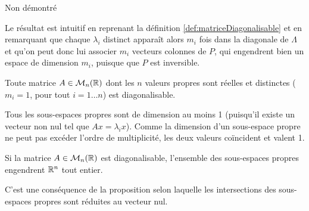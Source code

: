 \proof
Non démontré
\eproof

\remark
Le résultat est intuitif en reprenant la définition \ref{def:matriceDiagonalisable} et en remarquant que chaque $\lambda_i$ distinct apparaît alors $m_i$ fois dans la diagonale de $\Lambda$ et qu'on peut donc lui associer $m_i$ vecteurs colonnes de $P$, qui engendrent bien un espace de dimension $m_i$, puisque que $P$ est inversible.

\begin{corollary*}
  Toute matrice $A \in \mathcal{M}_n(\mathbb{R})$ dont les $n$ valeurs propres sont réelles et distinctes ($m_i = 1$, pour tout $i = 1 \dots n$) est diagonalisable.
\end{corollary*}

\proof
Tous les sous-espaces propres sont de dimension au moins 1 (puisqu'il existe un vecteur non nul tel que $Ax = \lambda_i x$). Comme la dimension d'un sous-espace propre ne peut pas excéder l'ordre de multiplicité, les deux valeurs coïncident et valent 1.
\eproof

\begin{corollary*}
  Si la matrice $A \in \mathcal{M}_n(\mathbb{R})$ est diagonalisable, l'ensemble des sous-espaces propres engendrent $\mathbb{R}^n$ tout entier.
\end{corollary*}

\proof
C'est une conséquence de la proposition selon laquelle les intersections des sous-espaces propres sont réduites au vecteur nul.
\eproof

